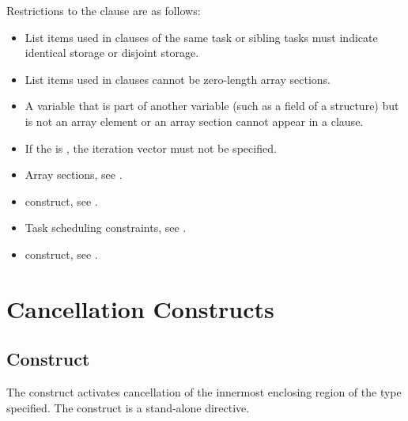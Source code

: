 \restrictions
Restrictions to the  clause are as follows:

\begin{itemize}
\item List items used in  clauses of the same task or sibling tasks must indicate 
identical storage or disjoint storage. 

\item List items used in  clauses cannot be zero-length array sections. 

\item A variable that is part of another variable (such as a field of a structure) but is not an 
array element or an array section cannot appear in a  clause.

\item If the  is , the iteration vector  must not be specified.  
\end{itemize}

\crossreferences
\begin{itemize}
\item Array sections, see
.

\item {} construct, see 
.

\item Task scheduling constraints, see
. 

\item {} construct, see
. 
\end{itemize}







\section{Cancellation Constructs}
\label{sec:Cancellation Constructs}
\subsection{ Construct}
\label{subsec:cancel Construct}
\summary
The  construct activates cancellation of the innermost enclosing region of the 
type specified. The  construct is a stand-alone directive.

